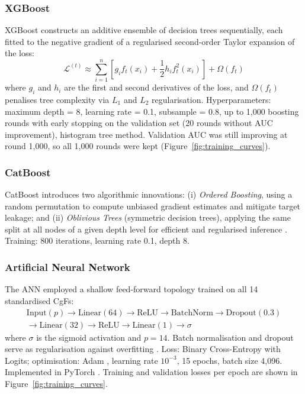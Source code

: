 \documentclass[12pt, a4paper]{article}
\begin{document}
\subsubsection{XGBoost}
XGBoost \citep{chen2016} constructs an additive ensemble of decision trees sequentially, each fitted to the negative gradient of a regularised second-order Taylor expansion of the loss:
\begin{equation}
    \mathcal{L}^{(t)} \approx \sum_{i=1}^{n} \left[g_i f_t(x_i) + \frac{1}{2}h_i f_t^2(x_i)\right] + \Omega(f_t)
\end{equation}
where $g_i$ and $h_i$ are the first and second derivatives of the loss, and $\Omega(f_t)$ penalises tree complexity via $L_1$ and $L_2$ regularisation. Hyperparameters: maximum depth = 8, learning rate = 0.1, subsample = 0.8, up to 1,000 boosting rounds with early stopping on the validation set (20 rounds without AUC improvement), histogram tree method. Validation AUC was still improving at round 1,000, so all 1,000 rounds were kept (Figure~\ref{fig:training_curves}).

\subsubsection{CatBoost}
CatBoost \citep{prokhorenkova2018} introduces two algorithmic innovations: (i) \textit{Ordered Boosting}, using a random permutation to compute unbiased gradient estimates and mitigate target leakage; and (ii) \textit{Oblivious Trees} (symmetric decision trees), applying the same split at all nodes of a given depth level for efficient and regularised inference \citep{Dorogush2018}. Training: 800 iterations, learning rate 0.1, depth 8.

\subsubsection{Artificial Neural Network}
The ANN employed a shallow feed-forward topology trained on all 14 standardised CgFs:
\begin{multline}
    \text{Input}(p) \to \text{Linear}(64) \to \text{ReLU} \to \text{BatchNorm} \to \text{Dropout}(0.3) \\
    \to \text{Linear}(32) \to \text{ReLU} \to \text{Linear}(1) \to \sigma
\end{multline}
where $\sigma$ is the sigmoid activation and $p = 14$. Batch normalisation and dropout serve as regularisation against overfitting \citep{ioffe2015, srivastava2014}. Loss: Binary Cross-Entropy with Logits; optimisation: Adam \citep{kingma2014}, learning rate $10^{-3}$, 15 epochs, batch size 4,096. Implemented in PyTorch \citep{paszke2019}. Training and validation losses per epoch are shown in Figure~\ref{fig:training_curves}.
\end{document}
